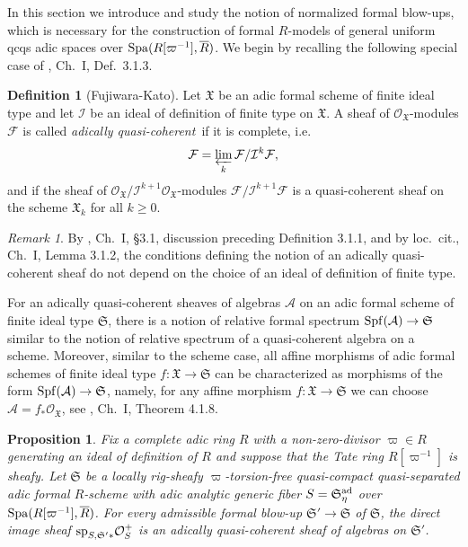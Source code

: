 \documentclass[12pt,twoside,a4paper]{article}
\newtheorem{prop}[thm]{Proposition}
\theoremstyle{definition}
\newtheorem{mydef}[thm]{Definition}
\theoremstyle{remark}
\newtheorem{rmk}[thm]{Remark}
\newcommand\ad{{\rm ad}}
\newcommand\spc{{\rm sp}}
\newcommand\Spa{{\rm Spa}}
\newcommand\Spf{{\rm Spf}}
\begin{document}
In this section we introduce and study the notion of normalized formal blow-ups, which is necessary for the construction of formal $R$-models of general uniform qcqs adic spaces over $\Spa(R[\varpi^{-1}], \overline{R})$. We begin by recalling the following special case of \cite{FK}, Ch.~I, Def.~3.1.3.
\begin{mydef}[Fujiwara-Kato]\label{Adically quasi-coherent sheaf}Let $\mathfrak{X}$ be an adic formal scheme of finite ideal type and let $\mathcal{I}$ be an ideal of definition of finite type on $\mathfrak{X}$. A sheaf of $\mathcal{O}_{\mathfrak{X}}$-modules $\mathcal{F}$ is called \textit{adically quasi-coherent}~if it is complete, i.e.\begin{equation*}\mathcal{F}=\varprojlim_{k}\mathcal{F}/\mathcal{I}^{k}\mathcal{F},\end{equation*}and if the sheaf of $\mathcal{O}_{\mathfrak{X}}/\mathcal{I}^{k+1}\mathcal{O}_{\mathfrak{X}}$-modules $\mathcal{F}/\mathcal{I}^{k+1}\mathcal{F}$ is a quasi-coherent sheaf on the scheme $\mathfrak{X}_{k}$ for all $k\geq 0$.\end{mydef}
\begin{rmk}\label{Completeness does not depend on an ideal of definition}By \cite{FK}, Ch.~I, \S3.1, discussion preceding Definition 3.1.1, and by loc.~cit., Ch.~I, Lemma 3.1.2, the conditions defining the notion of an adically quasi-coherent sheaf do not depend on the choice of an ideal of definition of finite type.\end{rmk}
For an adically quasi-coherent sheaves of algebras $\mathcal{A}$ on an adic formal scheme of finite ideal type $\mathfrak{S}$, there is a notion of relative formal spectrum $\Spf(\mathcal{A})\to \mathfrak{S}$ similar to the notion of relative spectrum of a quasi-coherent algebra on a scheme. Moreover, similar to the scheme case, all affine morphisms of adic formal schemes of finite ideal type $f: \mathfrak{X}\to \mathfrak{S}$ can be characterized as morphisms of the form $\Spf(\mathcal{A})\to \mathfrak{S}$, namely, for any affine morphism $f: \mathfrak{X}\to \mathfrak{S}$ we can choose $\mathcal{A}=f_{\ast}\mathcal{O}_{\mathfrak{X}}$, see \cite{FK}, Ch.~I, Theorem 4.1.8.  
 \begin{prop}\label{Quasi-coherent algebras and formal models}Fix a complete adic ring $R$ with a non-zero-divisor $\varpi\in R$ generating an ideal of definition of $R$ and suppose that the Tate ring $R[\varpi^{-1}]$ is sheafy. Let $\mathfrak{S}$ be a locally rig-sheafy $\varpi$-torsion-free quasi-compact quasi-separated adic formal $R$-scheme with adic analytic generic fiber $S=\mathfrak{S}_{\eta}^{\ad}$ over $\Spa(R[\varpi^{-1}], \overline{R})$. For every admissible formal blow-up $\mathfrak{S}'\to \mathfrak{S}$ of $\mathfrak{S}$, the direct image sheaf $\spc_{S,\mathfrak{S}'\ast}\mathcal{O}_{S}^{+}$ is an adically quasi-coherent sheaf of algebras on $\mathfrak{S}'$.\end{prop}
\end{document}
